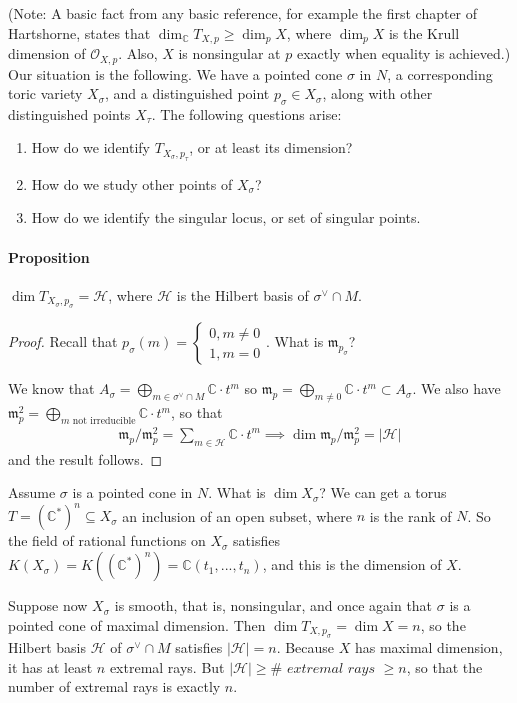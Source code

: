 \documentclass[a4paper,12pt]{amsart}
\newcommand{\CC}{\mathbb{C}}
\begin{document}
(Note: A basic fact from any basic reference, for example the first chapter of Hartshorne, states that $\dim_\CC T_{X,p} \geq \dim_p X$, where $\dim_p X$ is the Krull dimension of $\mathcal{O}_{X,p}$. Also, $X$ is nonsingular at $p$ exactly when equality is achieved.) \\

Our situation is the following. We have a pointed cone $\sigma$ in $N$, a corresponding toric variety $X_\sigma$, and a distinguished point $p_\sigma \in X_\sigma$, along with other distinguished points $X_\tau$. The following questions arise:
\begin{enumerate}%
	\item How do we identify $T_{X_\sigma, p_\tau}$, or at least its dimension?
	\item How do we study other points of $X_\sigma$?
	\item How do we identify the singular locus, or set of singular points.
\end{enumerate}

\paragraph{Proposition}
\begin{Proposition}
$\dim T_{X_\sigma, p_\sigma} = \mathcal{H}$, where $\mathcal{H}$ is the Hilbert basis of $\sigma^\vee \cap M$.
\end{Proposition}
\begin{proof}
Recall that $p_\sigma(m) = \begin{cases}
0, m \neq 0 \\
1, m = 0 
\end{cases}$. What is $\mathfrak{m}_{p_\sigma}$? 

We know that $A_\sigma = \bigoplus_{m \in \sigma^\vee \cap M} \CC \cdot t^m$ so $\mathfrak{m}_p = \bigoplus_{m \neq 0} \CC \cdot t^m \subset A_\sigma$. We also have $\mathfrak{m}_p^2 = \bigoplus_{m \text{ not irreducible}} \CC \cdot t^m$, so that 
\begin{align*}
\mathfrak{m}_p / \mathfrak{m}_p^2 = \sum_{m \in \mathcal{H}} \CC \cdot t^m \implies \dim \mathfrak{m}_p / \mathfrak{m}_p^2 =  | \mathcal{H} | 
\end{align*}
and the result follows.
\end{proof}

\begin{Remark}
	Assume $\sigma$ is a pointed cone in $N$. What is $\dim X_\sigma$? We can get a torus $T = (\CC^*)^n \subseteq X_\sigma$ an inclusion of an open subset, where $n$ is the rank of $N$. So the field of rational functions on $X_\sigma$ satisfies $K(X_\sigma) = K((\CC^*)^n) = \CC(t_1, ..., t_n)$, and this is the dimension of $X$. 
\end{Remark}
Suppose now $X_\sigma$ is smooth, that is, nonsingular, and once again that $\sigma$ is a pointed cone of maximal dimension. Then $\dim T_{X, p_\sigma} = \dim X = n$, so the Hilbert basis $\mathcal{H}$ of $\sigma^\vee \cap M$ satisfies $|\mathcal{H}| = n$. Because $X$ has maximal dimension, it has at least $n$ extremal rays. But $|\mathcal{H}| \geq \# \textit{ extremal rays } \geq n$, so that the number of extremal rays is exactly $n$.
\end{document}
